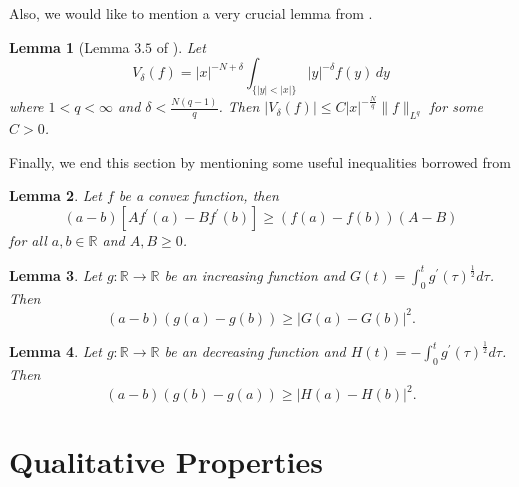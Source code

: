 \documentclass[11pt]{article}
\newtheorem{lemma}{Lemma}[section] %
\newcommand{\de} {\delta}
\newcommand{\real}{\mathbb{R}}
\newcommand{\lv}{\lVert}
\newcommand{\rv}{\rVert}
\begin{document}
Also, we would like to mention a very crucial lemma from \cite{stein_weiss1957fractional}.
\begin{lemma}[Lemma $3.5$ of \cite{stein_weiss1957fractional}]\label{lem:stein_strong_lemma}
Let 
\begin{equation*}
    V_{\de}(f) = |x|^{-N + \delta} \int_{\{|y| < |x|\}} |y|^{- \delta} f(y) \, dy
\end{equation*}
where $1< q < \infty$ and $\de < \frac{N(q-1)}{q}$. Then $|V_{\de}(f)| \leq C |x|^{-\frac{N}{q}} \lv f \rv_{L^q}$ for some $C>0$.
\end{lemma}

Finally, we end this section by mentioning some useful inequalities borrowed from \cite{brasco_second_eigenvalue}
\begin{lemma}\label{ineq:A1}
    Let $f$ be a convex function, then 
    \begin{equation*}
        (a-b)[A f^{\prime}(a) - B f^{\prime}(b)] \geq (f(a) - f(b))(A - B)
    \end{equation*}
for all $a, b \in \real$ and $A, B \geq 0$.
\end{lemma}

\begin{lemma}\label{ineq:A2}
Let $g : \real \to \real $ be an increasing function and $G(t) = \int_0^t g^{\prime} (\tau)^{\frac{1}{2}} d\tau$. Then
\begin{equation*}
    (a - b)(g(a) - g(b)) \geq |G(a) - G(b)|^2.
\end{equation*}
\end{lemma}

\begin{lemma}\label{ineq:A3}
Let $g : \real \to \real $ be an decreasing function and $H(t) = -\int_0^t g^{\prime} (\tau)^{\frac{1}{2}} d\tau$. Then
\begin{equation*}
    (a - b)(g(b) - g(a)) \geq |H(a) - H(b)|^2.
\end{equation*}
\end{lemma}


\section{Qualitative Properties}\label{sec:asymptotics}
\end{document}
